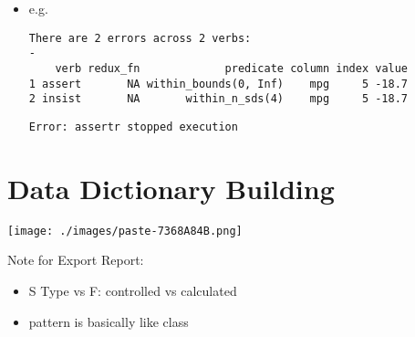 \documentclass[
  letterpaper,
  DIV=11,
  numbers=noendperiod,
  oneside]{scrreprt}
\newenvironment{Shaded}{\begin{snugshade}}{\end{snugshade}}
\newcommand{\ConstantTok}[1]{\textcolor[rgb]{0.56,0.35,0.01}{#1}}
\newcommand{\DecValTok}[1]{\textcolor[rgb]{0.68,0.00,0.00}{#1}}
\newcommand{\FunctionTok}[1]{\textcolor[rgb]{0.28,0.35,0.67}{#1}}
\newcommand{\NormalTok}[1]{\textcolor[rgb]{0.00,0.23,0.31}{#1}}
\newcommand{\OtherTok}[1]{\textcolor[rgb]{0.00,0.23,0.31}{#1}}
\newcommand{\SpecialCharTok}[1]{\textcolor[rgb]{0.37,0.37,0.37}{#1}}
\begin{document}
\begin{itemize}
\begin{itemize}
    \begin{itemize}
    \item
      e.g.

\begin{Shaded}
\end{Shaded}

\begin{verbatim}
There are 2 errors across 2 verbs:
- 
    verb redux_fn             predicate column index value
1 assert       NA within_bounds(0, Inf)    mpg     5 -18.7
2 insist       NA       within_n_sds(4)    mpg     5 -18.7
\end{verbatim}

\begin{verbatim}
Error: assertr stopped execution
\end{verbatim}
    \end{itemize}
  \end{itemize}
\end{itemize}

\hypertarget{data-dictionary-building}{%
\section{Data Dictionary Building}\label{data-dictionary-building}}

\texttt{[image: ./images/paste-7368A84B.png]}

Note for Export Report:

\begin{itemize}
\item
  S Type vs F: controlled vs calculated
\item
  pattern is basically like class
\end{itemize}
\end{document}
